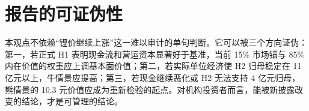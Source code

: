 \section{报告的可证伪性}

本观点不依赖“锂价继续上涨”这一难以审计的单句判断。它可以被三个方向证伪：第一，若正式 H1 表明现金流和营运资本显著好于基准，当前 15\% 市场锚与 85\% 内在价值的权重应上调基本面价值；第二，若实际单位经济使 H2 归母稳定在 11 亿元以上，牛情景应提高；第三，若现金继续恶化或 H2 无法支持 4 亿元归母，熊情景的 10.3 元价值应成为重新检验的起点。对机构投资者而言，能被新披露改变的结论，才是可管理的结论。

